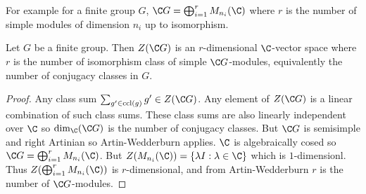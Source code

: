 \documentclass[a4paper]{article}
\begin{document}
For example for a finite group \(G\), \(\C G = \bigoplus_{i = 1}^r M_{n_i}(\C)\) where \(r\) is the number of simple modules of dimension \(n_i\) up to isomorphism.

\begin{corollary}
  Let \(G\) be a finite group. Then \(Z(\C G)\) is an \(r\)-dimensional \(\C\)-vector space where \(r\) is the number of isomorphism class of simple \(\C G\)-modules, equivalently the number of conjugacy classes in \(G\).
\end{corollary}

\begin{proof}
  Any class sum \(\sum_{g' \in \mathrm{ccl}(g)} g' \in Z(\C G)\). Any element of \(Z(\C G)\) is a linear combination of such class sums. These class sums are also linearly independent over \(\C\) so \(\dim_\C (\C G)\) is the number of conjugacy classes. But \(\C G\) is semisimple and right Artinian so Artin-Wedderburn applies. \(\C\) is algebraically cosed so \(\C G = \bigoplus_{i = 1}^r M_{n_i}(\C)\). But \(Z(M_{n_i}(\C)) = \{\lambda I: \lambda \in \C\}\) which is \(1\)-dimensionl. Thus \(Z(\bigoplus_{i = 1}^r M_{n_i}(\C))\) is \(r\)-dimensional, and from Artin-Wedderburn \(r\) is the number of \(\C G\)-modules.
\end{proof}
\end{document}
